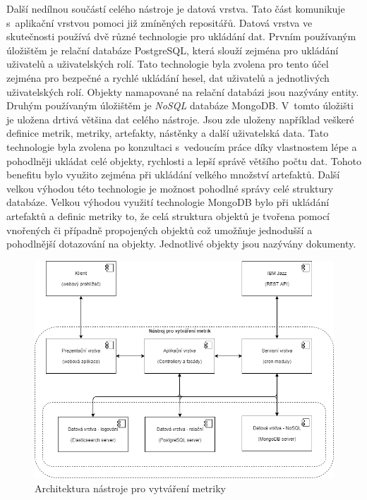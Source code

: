 \documentclass[czech,master]{diploma}
\begin{document}
Další nedílnou součástí celého nástroje je datová vrstva. Tato část komunikuje s~aplikační vrstvou pomoci již zmíněných repositářů. Datová vrstva ve skutečnosti používá dvě různé technologie pro ukládání dat. Prvním používaným úložištěm je relační databáze PostgreSQL, která slouží zejména pro ukládání uživatelů a uživatelských rolí. Tato technologie byla zvolena pro tento účel zejména pro bezpečné a rychlé ukládání hesel, dat uživatelů a jednotlivých uživatelských rolí. Objekty namapované na relační databázi jsou nazývány entity. Druhým používaným úložištěm je \textit{NoSQL} databáze MongoDB. V~tomto úložišti je uložena drtivá většina dat celého nástroje. Jsou zde uloženy například veškeré definice metrik, metriky, artefakty, nástěnky a další uživatelská data. Tato technologie byla zvolena po konzultaci s~vedoucím práce díky vlastnostem lépe a pohodlněji ukládat celé objekty, rychlosti a lepší správě většího počtu dat. Tohoto benefitu bylo využito zejména při ukládání velkého množství artefaktů. Další velkou výhodou této technologie je možnost pohodlné správy celé struktury databáze. Velkou výhodou využití technologie MongoDB bylo při ukládání artefaktů a definic metriky to, že celá struktura objektů je tvořena pomocí vnořených či případně propojených objektů což umožňuje jednodušší a pohodlnější dotazování na objekty. Jednotlivé objekty jsou nazývány dokumenty.



\begin{figure}[!ht]
    \centering
    \includegraphics[width=1\textwidth]{Diplomka/Figures/architektura.png}
    \caption{Architektura nástroje pro vytváření metriky}
    \label{fig:architektura_nastroje}
\end{figure}
\end{document}
